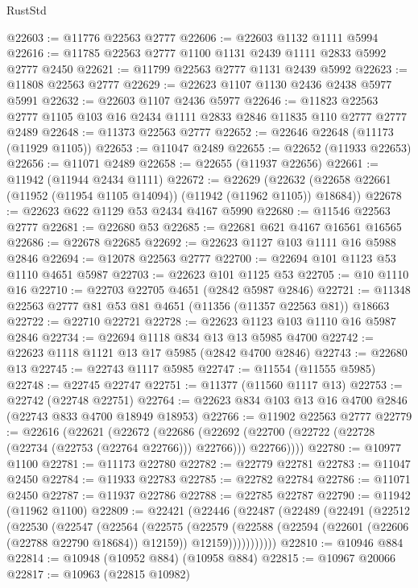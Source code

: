 \begin{lexlean}{RustStd}
\begin{coremodule}
@22603 := @11776 @22563 @2777
@22606 := @22603 @1132 @1111 @5994
@22616 := @11785 @22563 @2777 @1100 @1131 @2439 @1111 @2833 @5992 @2777 @2450
@22621 := @11799 @22563 @2777 @1131 @2439 @5992
@22623 := @11808 @22563 @2777
@22629 := @22623 @1107 @1130 @2436 @2438 @5977 @5991
@22632 := @22603 @1107 @2436 @5977
@22646 := @11823 @22563 @2777 @1105 @103 @16 @2434 @1111 @2833 @2846 @11835 @110 @2777 @2777 @2489
@22648 := @11373 @22563 @2777
@22652 := @22646 @22648 (@11173 (@11929 @1105))
@22653 := @11047 @2489
@22655 := @22652 (@11933 @22653)
@22656 := @11071 @2489
@22658 := @22655 (@11937 @22656)
@22661 := @11942 (@11944 @2434 @1111)
@22672 := @22629
    (@22632 (@22658 @22661 (@11952 (@11954 @1105 @14094)) (@11942 (@11962 @1105)) @18684))
@22678 := @22623 @622 @1129 @53 @2434 @4167 @5990
@22680 := @11546 @22563 @2777
@22681 := @22680 @53
@22685 := @22681 @621 @4167 @16561 @16565
@22686 := @22678 @22685
@22692 := @22623 @1127 @103 @1111 @16 @5988 @2846
@22694 := @12078 @22563 @2777
@22700 := @22694 @101 @1123 @53 @1110 @4651 @5987
@22703 := @22623 @101 @1125 @53
@22705 := @10 @1110 @16
@22710 := @22703 @22705 @4651 (@2842 @5987 @2846)
@22721 := @11348 @22563 @2777 @81 @53 @81 @4651 (@11356 (@11357 @22563 @81)) @18663
@22722 := @22710 @22721
@22728 := @22623 @1123 @103 @1110 @16 @5987 @2846
@22734 := @22694 @1118 @834 @13 @13 @5985 @4700
@22742 := @22623 @1118 @1121 @13 @17 @5985 (@2842 @4700 @2846)
@22743 := @22680 @13
@22745 := @22743 @1117 @5985
@22747 := @11554 (@11555 @5985)
@22748 := @22745 @22747
@22751 := @11377 (@11560 @1117 @13)
@22753 := @22742 (@22748 @22751)
@22764 := @22623 @834 @103 @13 @16 @4700 @2846 (@22743 @833 @4700 @18949 @18953)
@22766 := @11902 @22563 @2777
@22779 := @22616
    (@22621
      (@22672
        (@22686
          (@22692 (@22700 (@22722 (@22728 (@22734 (@22753 (@22764 @22766))) @22766))) @22766))))
@22780 := @10977 @1100
@22781 := @11173 @22780
@22782 := @22779 @22781
@22783 := @11047 @2450
@22784 := @11933 @22783
@22785 := @22782 @22784
@22786 := @11071 @2450
@22787 := @11937 @22786
@22788 := @22785 @22787
@22790 := @11942 (@11962 @1100)
@22809 := @22421
    (@22446
      (@22487
        (@22489
          (@22491
            (@22512
              (@22530
                (@22547
                  (@22564
                    (@22575
                      (@22579
                        (@22588
                          (@22594 (@22601 (@22606 (@22788 @22790 @18684)) @12159))
                          @12159)))))))))))
@22810 := @10946 @884
@22814 := @10948 (@10952 @884) (@10958 @884)
@22815 := @10967 @20066
@22817 := @10963 (@22815 @10982)

\end{coremodule}
\end{lexlean}
